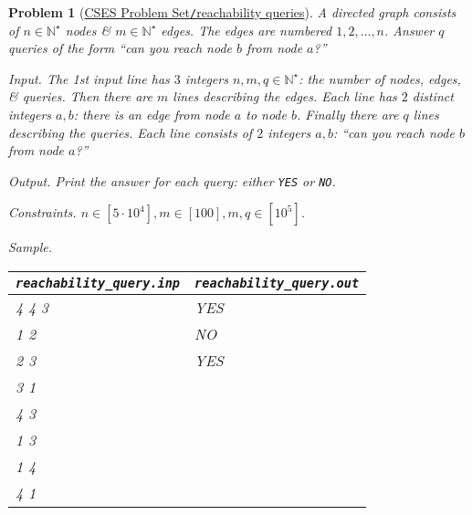 \documentclass{article}
\newtheorem{problem}{Problem}
\begin{document}
\begin{problem}[\href{https://cses.fi/problemset/task/2143}{CSES Problem Set{\tt/}reachability queries}]
    A directed graph consists of $n\in\mathbb{N}^\star$ nodes \& $m\in\mathbb{N}^\star$ edges. The edges are numbered $1,2,\ldots,n$. Answer $q$ queries of the form ``can you reach node $b$ from node $a$?''
    \item {\sf Input.} The 1st input line has $3$ integers $n,m,q\in\mathbb{N}^\star$: the number of nodes, edges, \& queries. Then there are $m$ lines describing the edges. Each line has $2$ distinct integers $a,b$: there is an edge from node $a$ to node $b$. Finally there are $q$ lines describing the queries. Each line consists of $2$ integers $a,b$: ``can you reach node $b$ from node $a$?''
    \item {\sf Output.} Print the answer for each query: either {\tt YES} or {\tt NO}.
    \item {\sf Constraints.} $n\in[5\cdot10^4],m\in[100],m,q\in[10^5]$.
    \item {\sf Sample.}
    \begin{table}[H]
        \centering
        \begin{tabular}{|l|l|}
            \hline
            \verb|reachability_query.inp| & \verb|reachability_query.out| \\
            \hline
            4 4 3 & YES \\
            1 2 & NO \\
            2 3 & YES \\
            3 1 & \\
            4 3 & \\
            1 3 & \\
            1 4 & \\
            4 1 & \\
            \hline
        \end{tabular}
    \end{table}
\end{problem}
\end{document}
